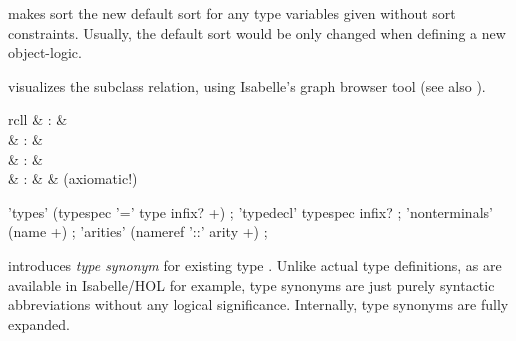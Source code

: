 \begin{isabellebody}
\begin{isamarkuptext}
\begin{descr}
  \item [\mbox{\isa{\isacommand{defaultsort}}}~\isa{s}] makes sort  the
  new default sort for any type variables given without sort
  constraints.  Usually, the default sort would be only changed when
  defining a new object-logic.

  \item [\mbox{\isa{\isacommand{class{\isacharunderscore}deps}}}] visualizes the subclass relation,
  using Isabelle's graph browser tool (see also \cite{isabelle-sys}).

  \end{descr}%
\end{isamarkuptext}%
\isamarkuptrue%
%
\isamarkuptrue%
%
\begin{isamarkuptext}%
\begin{matharray}{rcll}
    \mbox{} & : &  \\
    \mbox{} & : &  \\
    \mbox{} & : &  \\
    \mbox{} & : &  & (axiomatic!) \\
  \end{matharray}

  \begin{rail}
    'types' (typespec '=' type infix? +)
    ;
    'typedecl' typespec infix?
    ;
    'nonterminals' (name +)
    ;
    'arities' (nameref '::' arity +)
    ;
  \end{rail}

  \begin{descr}

  \item [\mbox{\isa{\isacommand{types}}}~\isa{{\isachardoublequote}{\isacharparenleft}{\isasymalpha}\isactrlsub {\isadigit{1}}{\isacharcomma}\ {\isasymdots}{\isacharcomma}\ {\isasymalpha}\isactrlsub n{\isacharparenright}\ t\ {\isacharequal}\ {\isasymtau}{\isachardoublequote}}]
  introduces \emph{type synonym} 
  for existing type \isa{{\isachardoublequote}{\isasymtau}{\isachardoublequote}}.  Unlike actual type definitions, as
  are available in Isabelle/HOL for example, type synonyms are just
  purely syntactic abbreviations without any logical significance.
  Internally, type synonyms are fully expanded.
  

\end{descr}
\end{isamarkuptext}
\end{isabellebody}
